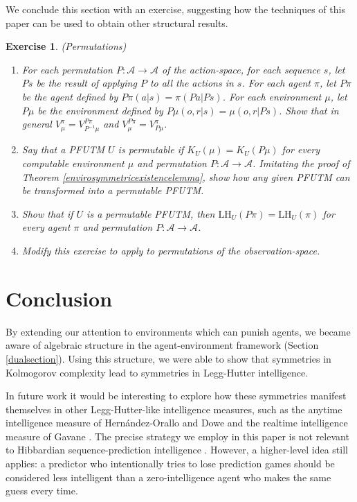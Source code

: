 \documentclass{article}
\newtheorem{exercise}[theorem]{Exercise}
\def\LH{\textrm{LH}}
\begin{document}
We conclude this section with an exercise, suggesting how the techniques of this paper
can be used to obtain other structural results.

\begin{exercise} (Permutations)
    \begin{enumerate}
        \item
        For each permutation $P:\mathcal A\to\mathcal A$ of the action-space,
        for each sequence $s$,
        let $Ps$ be the result of applying $P$ to all the actions in $s$.
        For each agent $\pi$, let $P\pi$ be the agent defined by
        $P\pi(a|s)=\pi(Pa|Ps)$. For each environment $\mu$, let
        $P\mu$ be the environment defined by
        $P\mu(o,r|s)=\mu(o,r|Ps)$. Show that in general
        $V^\pi_\mu = V^{P\pi}_{P^{-1}\mu}$
        and
        $V^{P\pi}_\mu = V^\pi_{P\mu}$.
        \item
        Say that a PFUTM $U$ is \emph{permutable} if
        $K_U(\mu)=K_U(P\mu)$ for every computable environment $\mu$
        and permutation $P:\mathcal A\to\mathcal A$. Imitating the proof of
        Theorem \ref{envirosymmetricexistencelemma}, show how any given
        PFUTM can be transformed into a permutable PFUTM.
        \item
        Show that if $U$ is a permutable PFUTM, then $\LH_U(P\pi)=\LH_U(\pi)$
        for every agent $\pi$ and permutation $P:\mathcal A\to\mathcal A$.
        \item
        Modify this exercise to apply to permutations
        of the observation-space.
    \end{enumerate}
\end{exercise}

\section{Conclusion}
\label{conclusionsecn}

By extending our attention to environments which can punish agents,
we became aware of algebraic structure in the agent-environment
framework (Section \ref{dualsection}). Using this structure, we were
able to show that symmetries in Kolmogorov complexity lead to
symmetries in Legg-Hutter intelligence.

In future work it would be interesting to explore how these symmetries
manifest themselves in other Legg-Hutter-like intelligence measures,
such as the anytime
intelligence measure of Hern{\'a}ndez-Orallo and Dowe \cite{hernandez}
and the realtime intelligence measure of Gavane \cite{gavane}.
The precise strategy we employ in this
paper is not relevant to Hibbardian sequence-prediction intelligence
\cite{hibbard} \cite{alexander2021measuring}. However, a higher-level
idea still applies:
a predictor who intentionally tries to lose prediction games
should be considered less intelligent than a zero-intelligence agent
who makes the same guess every time.
\end{document}
